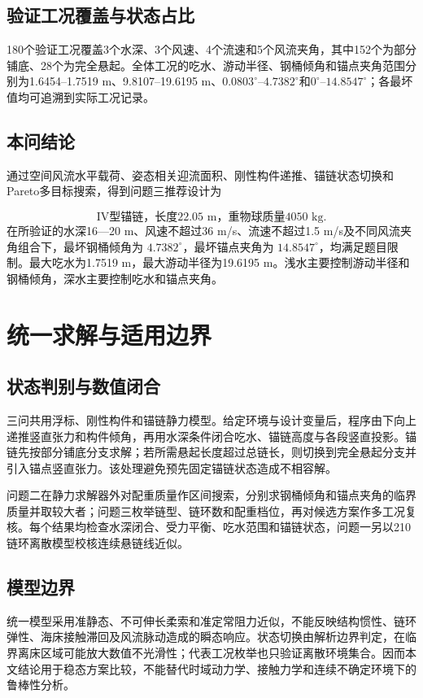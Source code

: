 \documentclass[UTF8,zihao=-4,a4paper,fontset=fandol]{ctexart}
\begin{document}
\subsection{验证工况覆盖与状态占比}
180个验证工况覆盖3个水深、3个风速、4个流速和5个风流夹角，其中152个为部分铺底、28个为完全悬起。全体工况的吃水、游动半径、钢桶倾角和锚点夹角范围分别为1.6454--1.7519 m、9.8107--19.6195 m、$0.0803^\circ$--$4.7382^\circ$和$0^\circ$--$14.8547^\circ$；各最坏值均可追溯到实际工况记录。

\subsection{本问结论}
通过空间风流水平载荷、姿态相关迎流面积、刚性构件递推、锚链状态切换和Pareto多目标搜索，得到问题三推荐设计为

\[
\boxed{
\text{IV型锚链，长度22.05 m，重物球质量4050 kg}
}.
\]
在所验证的水深16—20 m、风速不超过36 m/s、流速不超过1.5 m/s及不同风流夹角组合下，最坏钢桶倾角为 \(4.7382^\circ\)，最坏锚点夹角为 \(14.8547^\circ\)，均满足题目限制。最大吃水为1.7519 m，最大游动半径为19.6195 m。浅水主要控制游动半径和钢桶倾角，深水主要控制吃水和锚点夹角。


\section{统一求解与适用边界}

\subsection{状态判别与数值闭合}

三问共用浮标、刚性构件和锚链静力模型。给定环境与设计变量后，程序由下向上递推竖直张力和构件倾角，再用水深条件闭合吃水、锚链高度与各段竖直投影。锚链先按部分铺底分支求解；若所需悬起长度超过总链长，则切换到完全悬起分支并引入锚点竖直张力。该处理避免预先固定锚链状态造成不相容解。

问题二在静力求解器外对配重质量作区间搜索，分别求钢桶倾角和锚点夹角的临界质量并取较大者；问题三枚举链型、链环数和配重档位，再对候选方案作多工况复核。每个结果均检查水深闭合、受力平衡、吃水范围和锚链状态，问题一另以210链环离散模型校核连续悬链线近似。

\subsection{模型边界}

统一模型采用准静态、不可伸长柔索和准定常阻力近似，不能反映结构惯性、链环弹性、海床接触滞回及风流脉动造成的瞬态响应。状态切换由解析边界判定，在临界离床区域可能放大数值不光滑性；代表工况枚举也只验证离散环境集合。因而本文结论用于稳态方案比较，不能替代时域动力学、接触力学和连续不确定环境下的鲁棒性分析。
\end{document}
